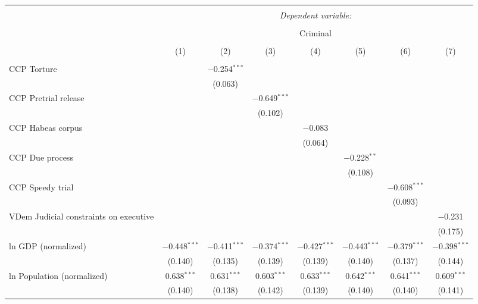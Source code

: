 
\begin{sidewaystable}[!htbp] \centering 
  \caption{} 
  \label{} 
\tiny 
\begin{tabular}{@{\extracolsep{5pt}}lccccccc} 
\\[-1.8ex]\hline 
\hline \\[-1.8ex] 
 & \multicolumn{7}{c}{\textit{Dependent variable:}} \\ 
\cline{2-8} 
\\[-1.8ex] & \multicolumn{7}{c}{Criminal} \\ 
\\[-1.8ex] & (1) & (2) & (3) & (4) & (5) & (6) & (7)\\ 
\hline \\[-1.8ex] 
 CCP Torture &  & $-$0.254$^{***}$ &  &  &  &  &  \\ 
  &  & (0.063) &  &  &  &  &  \\ 
  CCP Pretrial release &  &  & $-$0.649$^{***}$ &  &  &  &  \\ 
  &  &  & (0.102) &  &  &  &  \\ 
  CCP Habeas corpus &  &  &  & $-$0.083 &  &  &  \\ 
  &  &  &  & (0.064) &  &  &  \\ 
  CCP Due process &  &  &  &  & $-$0.228$^{**}$ &  &  \\ 
  &  &  &  &  & (0.108) &  &  \\ 
  CCP Speedy trial &  &  &  &  &  & $-$0.608$^{***}$ &  \\ 
  &  &  &  &  &  & (0.093) &  \\ 
  VDem Judicial constraints on executive &  &  &  &  &  &  & $-$0.231 \\ 
  &  &  &  &  &  &  & (0.175) \\ 
  ln GDP (normalized) & $-$0.448$^{***}$ & $-$0.411$^{***}$ & $-$0.374$^{***}$ & $-$0.427$^{***}$ & $-$0.443$^{***}$ & $-$0.379$^{***}$ & $-$0.398$^{***}$ \\ 
  & (0.140) & (0.135) & (0.139) & (0.139) & (0.140) & (0.137) & (0.144) \\ 
  ln Population (normalized) & 0.638$^{***}$ & 0.631$^{***}$ & 0.603$^{***}$ & 0.633$^{***}$ & 0.642$^{***}$ & 0.641$^{***}$ & 0.609$^{***}$ \\ 
  & (0.140) & (0.138) & (0.142) & (0.139) & (0.140) & (0.140) & (0.141) \\ 

\end{tabular}
\end{sidewaystable}

